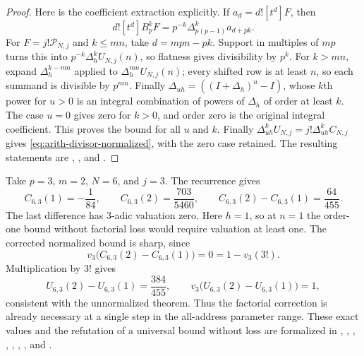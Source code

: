 \begin{proof}
Here is the coefficient extraction explicitly. If $a_d=d![t^d]F$,
then
\[
 d![t^d]B_p^kF=p^{-k}\Delta_{p(p-1)}^ka_{d+pk}.
\]
For $F=j!\mathcal P_{N,j}$ and $k\le mn$, take $d=mpn-pk$.
Support in multiples of $mp$ turns this into
$p^{-k}\Delta_h^kU_{N,j}(n)$, so flatness gives divisibility by $p^k$.
For $k>mn$, expand $\Delta_h^{k-mn}$ applied to
$\Delta_h^{mn}U_{N,j}(n)$; every shifted row is at least $n$, so
each summand is divisible by $p^{mn}$. Finally
$\Delta_{uh}=((I+\Delta_h)^u-I)$, whose $k$th power for $u>0$
is an integral combination of powers of $\Delta_h$ of order at least $k$.
The case $u=0$ gives zero for $k>0$, and order zero is the original
integral coefficient. This proves the bound for all $u$ and $k$.
Finally $\Delta_{uh}^kU_{N,j}=j!\Delta_{uh}^kC_{N,j}$ gives
\eqref{eq:arith-divisor-normalized}, with the zero case retained.
The resulting statements are
,
, and
.
\end{proof}

\begin{example}
\label{ex:arith-normalization-loss}
Take $p=3$, $m=2$, $N=6$, and $j=3$.  The recurrence gives
\[
 C_{6,3}(1)=-\frac1{84},\qquad
 C_{6,3}(2)=\frac{703}{5460},\qquad
 C_{6,3}(2)-C_{6,3}(1)=\frac{64}{455}.
\]
The last difference has $3$-adic valuation zero.  Here $h=1$, so at
$n=1$ the order-one bound without factorial loss would require valuation
at least one.  The corrected normalized bound is sharp, since
\[
 v_3\bigl(C_{6,3}(2)-C_{6,3}(1)\bigr)=0=1-v_3(3!).
\]
Multiplication by $3!$ gives
\[
 U_{6,3}(2)-U_{6,3}(1)=\frac{384}{455},\qquad
 v_3\bigl(U_{6,3}(2)-U_{6,3}(1)\bigr)=1,
\]
consistent with the unnormalized theorem.  Thus the factorial correction
is already necessary at a single step in the all-address parameter range.
These exact values and the refutation of a universal bound without loss
are formalized in
,
,
,
,
,
,
, and
.
\end{example}

